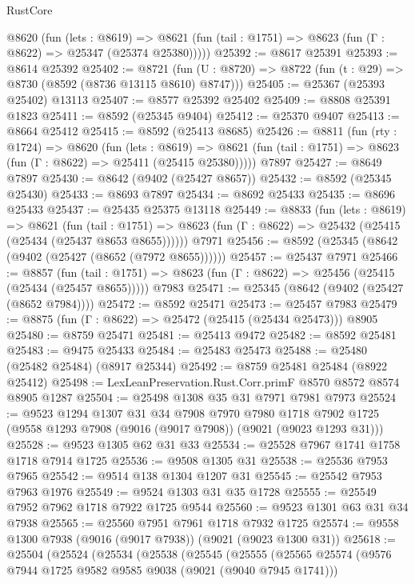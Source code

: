 \begin{lexlean}{RustCore}
\begin{coremodule}
    @8620
      (fun (lets : @8619) =>
      @8621 (fun (tail : @1751) => @8623 (fun (Γ : @8622) => @25347 (@25374 @25380)))))
@25392 := @8617 @25391
@25393 := @8614 @25392
@25402 := @8721
    (fun (U : @8720) => @8722 (fun (t : @29) => @8730 (@8592 (@8736 @13115 @8610) @8747)))
@25405 := @25367 (@25393 @25402) @13113
@25407 := @8577 @25392 @25402
@25409 := @8808 @25391 @1823
@25411 := @8592 (@25345 @9404)
@25412 := @25370 @9407
@25413 := @8664 @25412
@25415 := @8592 (@25413 @8685)
@25426 := @8811
    (fun (rty : @1724) =>
    @8620
      (fun (lets : @8619) =>
      @8621 (fun (tail : @1751) => @8623 (fun (Γ : @8622) => @25411 (@25415 @25380)))))
    @7897
@25427 := @8649 @7897
@25430 := @8642 (@9402 (@25427 @8657))
@25432 := @8592 (@25345 @25430)
@25433 := @8693 @7897
@25434 := @8692 @25433
@25435 := @8696 @25433
@25437 := @25435 @25375 @13118
@25449 := @8833
    (fun (lets : @8619) =>
    @8621
      (fun (tail : @1751) =>
      @8623 (fun (Γ : @8622) => @25432 (@25415 (@25434 (@25437 @8653 @8655))))))
    @7971
@25456 := @8592 (@25345 (@8642 (@9402 (@25427 (@8652 (@7972 @8655))))))
@25457 := @25437 @7971
@25466 := @8857
    (fun (tail : @1751) => @8623 (fun (Γ : @8622) => @25456 (@25415 (@25434 (@25457 @8655)))))
    @7983
@25471 := @25345 (@8642 (@9402 (@25427 (@8652 @7984))))
@25472 := @8592 @25471
@25473 := @25457 @7983
@25479 := @8875 (fun (Γ : @8622) => @25472 (@25415 (@25434 @25473))) @8905
@25480 := @8759 @25471
@25481 := @25413 @9472
@25482 := @8592 @25481
@25483 := @9475 @25433
@25484 := @25483 @25473
@25488 := @25480 (@25482 @25484) (@8917 @25344)
@25492 := @8759 @25481 @25484 (@8922 @25412)
@25498 := LexLeanPreservation.Rust.Corr.primF @8570 @8572 @8574 @8905 @1287
@25504 := @25498 @1308 @35 @31 @7971 @7981 @7973
@25524 := @9523
    @1294
    @1307
    @31
    @34
    @7908
    @7970
    @7980
    @1718
    @7902
    @1725
    (@9558 @1293 @7908 (@9016 (@9017 @7908)) (@9021 (@9023 @1293 @31)))
@25528 := @9523 @1305 @62 @31 @33
@25534 := @25528 @7967 @1741 @1758 @1718 @7914 @1725
@25536 := @9508 @1305 @31
@25538 := @25536 @7953 @7965
@25542 := @9514 @138 @1304 @1207 @31
@25545 := @25542 @7953 @7963 @1976
@25549 := @9524 @1303 @31 @35 @1728
@25555 := @25549 @7952 @7962 @1718 @7922 @1725 @9544
@25560 := @9523 @1301 @63 @31 @34 @7938
@25565 := @25560 @7951 @7961 @1718 @7932 @1725
@25574 := @9558 @1300 @7938 (@9016 (@9017 @7938)) (@9021 (@9023 @1300 @31))
@25618 := @25504
    (@25524
      (@25534
        (@25538
          (@25545
            (@25555
              (@25565
                @25574
                (@9576 @7944 @1725 @9582 @9585 @9038 (@9021 (@9040 @7945 @1741)))

\end{coremodule}
\end{lexlean}
